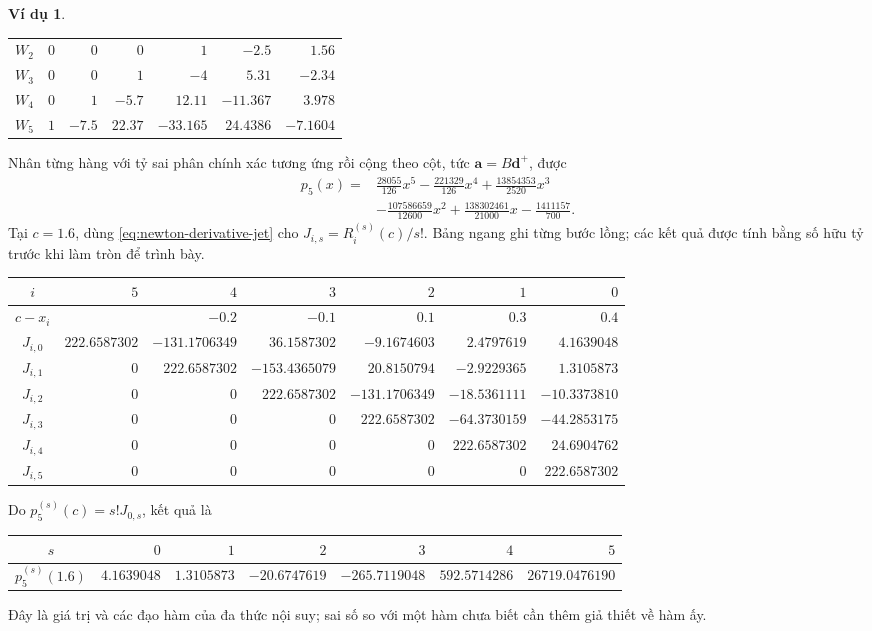 \documentclass[12pt,a4paper,oneside]{book}
\numberwithin{algorithm}{chapter}
\theoremstyle{definition}
\newtheorem{vidu}{Ví dụ}[chapter]
\begin{document}
\begin{vidu}
\begin{center}
\begin{tabular}{c|rrrrrr}
$W_2$&$0$&$0$&$0$&$1$&$-2.5$&$1.56$\\
$W_3$&$0$&$0$&$1$&$-4$&$5.31$&$-2.34$\\
$W_4$&$0$&$1$&$-5.7$&$12.11$&$-11.367$&$3.978$\\
$W_5$&$1$&$-7.5$&$22.37$&$-33.165$&$24.4386$&$-7.1604$\\\bottomrule
\end{tabular}
\end{center}
Nhân từng hàng với tỷ sai phân chính xác tương ứng rồi cộng theo cột, tức $\boldsymbol a=B\boldsymbol d^+$, được
\begin{align*}
p_5(x)={}&\frac{28055}{126}x^5-\frac{221329}{126}x^4
 +\frac{13854353}{2520}x^3\\
 &-\frac{107586659}{12600}x^2+\frac{138302461}{21000}x
 -\frac{1411157}{700}.
\end{align*}
Tại $c=1.6$, dùng \eqref{eq:newton-derivative-jet} cho $J_{i,s}=R_i^{(s)}(c)/s!$. Bảng ngang ghi từng bước lồng; các kết quả được tính bằng số hữu tỷ trước khi làm tròn để trình bày.
\begin{center}
\scriptsize\setlength{\tabcolsep}{4pt}
\begin{tabular}{c|rrrrrr}\toprule
$i$&$5$&$4$&$3$&$2$&$1$&$0$\\\midrule
$c-x_i$&&$-0.2$&$-0.1$&$0.1$&$0.3$&$0.4$\\
$J_{i,0}$&$222.6587302$&$-131.1706349$&$36.1587302$&$-9.1674603$&$2.4797619$&$4.1639048$\\
$J_{i,1}$&$0$&$222.6587302$&$-153.4365079$&$20.8150794$&$-2.9229365$&$1.3105873$\\
$J_{i,2}$&$0$&$0$&$222.6587302$&$-131.1706349$&$-18.5361111$&$-10.3373810$\\
$J_{i,3}$&$0$&$0$&$0$&$222.6587302$&$-64.3730159$&$-44.2853175$\\
$J_{i,4}$&$0$&$0$&$0$&$0$&$222.6587302$&$24.6904762$\\
$J_{i,5}$&$0$&$0$&$0$&$0$&$0$&$222.6587302$\\\bottomrule
\end{tabular}
\end{center}
Do $p_5^{(s)}(c)=s!J_{0,s}$, kết quả là
\begin{center}
\small\setlength{\tabcolsep}{4pt}
\begin{tabular}{c|rrrrrr}\toprule
$s$&$0$&$1$&$2$&$3$&$4$&$5$\\\midrule
$p_5^{(s)}(1.6)$&$4.1639048$&$1.3105873$&$-20.6747619$&$-265.7119048$&$592.5714286$&$26719.0476190$\\\bottomrule
\end{tabular}
\end{center}
Đây là giá trị và các đạo hàm của đa thức nội suy; sai số so với một hàm chưa biết cần thêm giả thiết về hàm ấy.
\end{vidu}
\end{document}
